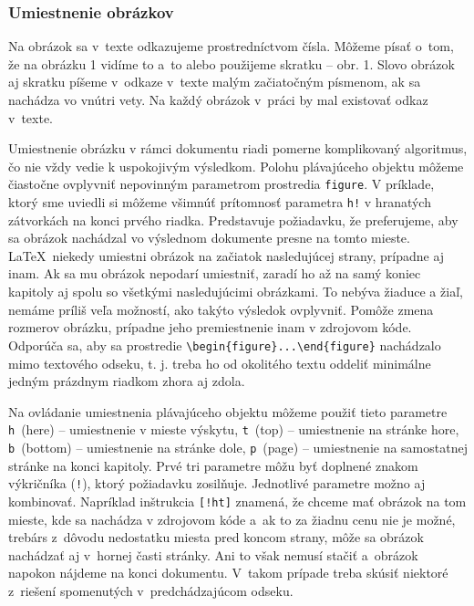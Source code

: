 \subsubsection{Umiestnenie obrázkov}\label{sec:figPlacement}
Na obrázok sa v~texte odkazujeme prostredníctvom čísla.
Môžeme písať o~tom, že na obrázku 1 vidíme to a~to
alebo použijeme skratku -- obr. 1.
Slovo obrázok aj skratku píšeme v~odkaze v~texte
malým začiatočným písmenom, ak sa nachádza vo vnútri vety.
Na každý obrázok v~práci by mal existovať odkaz v~texte.

Umiestnenie obrázku v rámci dokumentu riadi pomerne
komplikovaný algoritmus, čo nie vždy vedie k uspokojivým výsledkom.
Polohu plávajúceho objektu môžeme čiastočne ovplyvniť
nepovinným parametrom prostredia \verb|figure|.
V príklade, ktorý sme uviedli si môžeme všimnúť prítomnosť parametra \verb|h!| v hranatých zátvorkách
na konci prvého riadka.
Predstavuje požiadavku, že preferujeme,  aby sa obrázok nachádzal vo výslednom dokumente presne na tomto mieste. \LaTeX\ niekedy umiestni obrázok na začiatok nasledujúcej strany, prípadne aj inam.
Ak sa mu obrázok nepodarí umiestniť, zaradí ho až na
samý koniec kapitoly aj spolu so všetkými nasledujúcimi obrázkami.
To nebýva žiaduce a žiaľ, nemáme príliš veľa možností, ako takýto výsledok ovplyvniť.
Pomôže zmena rozmerov obrázku, prípadne jeho premiestnenie inam v zdrojovom kóde.
Odporúča sa, aby sa prostredie \verb|\begin{figure}...\end{figure}| nachádzalo mimo textového odseku, t. j. treba ho od okolitého textu oddeliť minimálne jedným prázdnym riadkom zhora aj zdola.

Na ovládanie umiestnenia plávajúceho objektu môžeme použiť tieto
parametre \verb|h|~(here) -- umiestnenie v mieste výskytu,
\verb|t|~(top) -- umiestnenie na stránke hore, \verb|b|~(bottom) --
umiestnenie na stránke dole, \verb|p|~(page) -- umiestnenie
na samostatnej stránke na konci kapitoly. Prvé tri
parametre môžu byť doplnené znakom výkričníka (\verb|!|),
ktorý požiadavku zosilňuje.
Jednotlivé parametre možno aj kombinovať.
Napríklad inštrukcia \verb|[!ht]| znamená, že chceme mať
obrázok na tom mieste, kde sa nachádza v zdrojovom kóde
a~ak to za žiadnu cenu nie je možné,
trebárs z~dôvodu nedostatku miesta pred koncom strany,
môže sa obrázok nachádzať aj v~hornej časti stránky.
Ani to však nemusí stačiť a~obrázok napokon nájdeme
na konci dokumentu.
V~takom prípade treba skúsiť niektoré
z~riešení spomenutých v~predchádzajúcom odseku.

